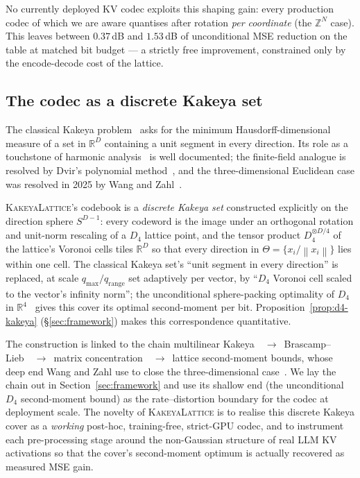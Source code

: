 \documentclass[11pt,a4paper]{article}
\theoremstyle{definition}
\theoremstyle{plain}
\newcommand{\R}{\mathbb{R}}
\newcommand{\Z}{\mathbb{Z}}
\newcommand{\norm}[1]{\left\lVert#1\right\rVert}
\begin{document}
No currently deployed KV codec exploits this shaping gain: every
production codec of which we are aware quantises after rotation
\emph{per coordinate} (the $\Z^N$ case). This leaves between
$0.37$\,dB and $1.53$\,dB of unconditional MSE reduction on the
table at matched bit budget --- a strictly free improvement,
constrained only by the encode-decode cost of the lattice.

\subsection{The codec as a discrete Kakeya set}
\label{sec:intro-kakeya}

The classical Kakeya
problem~\cite{kakeya-problem,besicovitch-1919,besicovitch-1928} asks
for the minimum Hausdorff-dimensional measure of a set in $\R^D$
containing a unit segment in every direction. Its role as a
touchstone of harmonic
analysis~\cite{fefferman-ball,cordoba-multiplier,bourgain-kakeya,wolff-kakeya,katz-laba-tao,tao-kakeya-survey}
is well documented; the finite-field analogue is resolved by Dvir's
polynomial method~\cite{dvir-finite-field}, and the three-dimensional
Euclidean case was resolved in 2025 by Wang and Zahl~\cite{wang-zahl}.

\textsc{KakeyaLattice}'s codebook is a \emph{discrete Kakeya set}
constructed explicitly on the direction sphere $S^{D-1}$: every
codeword is the image under an orthogonal rotation and unit-norm
rescaling of a $D_4$ lattice point, and the tensor product
$D_4^{\otimes D/4}$ of the lattice's Voronoi cells tiles $\R^D$ so
that every direction in $\Theta = \{x_i/\norm{x_i}\}$ lies within
one cell. The classical Kakeya set's ``unit segment in every
direction'' is replaced, at scale $q_\mathrm{max}/q_\mathrm{range}$
set adaptively per vector, by ``$D_4$ Voronoi cell scaled to the
vector's infinity norm''; the unconditional sphere-packing
optimality of $D_4$ in $\R^4$~\cite{conway-sloane-book} gives this
cover its optimal second-moment per bit. Proposition~\ref{prop:d4-kakeya}
(\S\ref{sec:framework}) makes this correspondence quantitative.

The construction is linked to the chain multilinear
Kakeya~\cite{guth-endpoint}~$\to$~Brascamp--Lieb~\cite{bennett-carbery-christ-tao}~$\to$~matrix
concentration~\cite{tropp-matrix-chernoff}~$\to$~lattice second-moment
bounds, whose deep end Wang and Zahl use to close the
three-dimensional case~\cite{wang-zahl}. We lay the chain out in
Section~\ref{sec:framework} and use its shallow end (the
unconditional $D_4$ second-moment bound) as the rate--distortion
boundary for the codec at deployment scale. The novelty of
\textsc{KakeyaLattice} is to realise this discrete Kakeya cover as a
\emph{working} post-hoc, training-free, strict-GPU codec, and to
instrument each pre-processing stage around the non-Gaussian
structure of real LLM KV activations so that the cover's
second-moment optimum is actually recovered as measured MSE gain.
\end{document}
